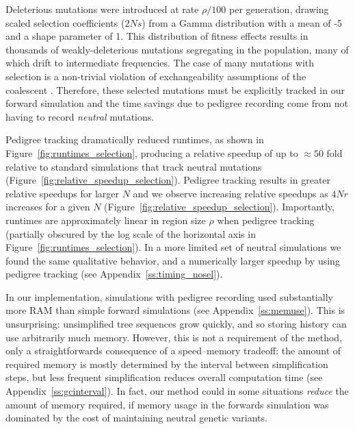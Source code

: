 \documentclass{article}
\begin{document}
Deleterious mutations were introduced at rate $\rho/100$ per generation, drawing scaled selection
coefficients ($2Ns$)
from a Gamma distribution with a mean of -5 and a shape parameter of 1.  This distribution of fitness effects results in
thousands of weakly-deleterious mutations segregating in the population, many of which drift to intermediate
frequencies.  The case of many mutations with selection is a non-trivial violation of exchangeability assumptions of the
coalescent \citep{Neuhauser1997-nn}.  Therefore, these selected mutations must be explicitly tracked in our forward simulation
and the time savings due to pedigree recording come from not having to record \textit{neutral} mutations.

Pedigree tracking dramatically reduced runtimes, as shown in Figure~\ref{fig:runtimes_selection},
producing a relative speedup of up to $\approx 50$ fold relative to standard simulations that track neutral mutations
(Figure~\ref{fig:relative_speedup_selection}).
Pedigree tracking results in greater relative speedups for larger $N$
and we observe increasing relative speedups as $4Nr$ increases for a given $N$
(Figure~\ref{fig:relative_speedup_selection}).
Importantly, runtimes are approximately linear in region size $\rho$ when pedigree tracking
(partially obscured by the log scale of the horizontal axis in Figure~\ref{fig:runtimes_selection}).
In a more limited set of neutral simulations we found the same qualitative behavior,
and a numerically larger speedup by using pedigree tracking (see Appendix~\ref{ss:timing_nosel}).

In our implementation, simulations with pedigree recording
used substantially more RAM than simple forward simulations (see Appendix~\ref{ss:memuse}).
This is unsurprising:
unsimplified tree sequences grow quickly, and so storing history can use arbitrarily much memory.
However, this is not a requirement of the method, only a straightforwards consequence of a speed--memory tradeoff:
the amount of required memory is mostly determined by the interval between simplification steps,
but less frequent simplification reduces overall computation time (see Appendix~\ref{ss:gcinterval}).
In fact, our method could in some situations \emph{reduce} the amount of memory required,
if memory usage in the forwards simulation was dominated by the cost of maintaining neutral genetic variants.
\end{document}
